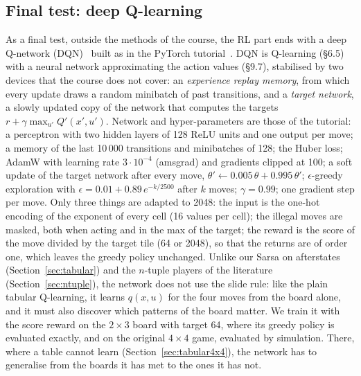 \documentclass[11pt,a4paper]{article}
\theoremstyle{remark}
\begin{document}
\subsection{Final test: deep Q-learning}
\label{sec:dqn}

As a final test, outside the methods of the course, the RL part ends with a deep Q-network (DQN)~\cite{mnih2015} built as in the PyTorch tutorial~\cite{paszke_dqn}. DQN is Q-learning (\S6.5) with a neural network approximating the action values (\S9.7), stabilised by two devices that the course does not cover: an \emph{experience replay memory}, from which every update draws a random minibatch of past transitions, and a \emph{target network}, a slowly updated copy of the network that computes the targets $r+\gamma\max_{u'}Q'(x',u')$. Network and hyper-parameters are those of the tutorial: a perceptron with two hidden layers of 128 ReLU units and one output per move; a memory of the last 10\,000 transitions and minibatches of 128; the Huber loss; AdamW with learning rate $3\cdot10^{-4}$ (amsgrad) and gradients clipped at 100; a soft update of the target network after every move, $\theta'\leftarrow0.005\,\theta+0.995\,\theta'$; $\epsilon$-greedy exploration with $\epsilon=0.01+0.89\,e^{-k/2500}$ after $k$ moves; $\gamma=0.99$; one gradient step per move. Only three things are adapted to 2048: the input is the one-hot encoding of the exponent of every cell (16 values per cell); the illegal moves are masked, both when acting and in the max of the target; the reward is the score of the move divided by the target tile (64 or 2048), so that the returns are of order one, which leaves the greedy policy unchanged. Unlike our Sarsa on afterstates (Section~\ref{sec:tabular}) and the $n$-tuple players of the literature (Section~\ref{sec:ntuple}), the network does not use the slide rule: like the plain tabular Q-learning, it learns $q(x,u)$ for the four moves from the board alone, and it must also discover which patterns of the board matter. We train it with the score reward on the $2\times3$ board with target 64, where its greedy policy is evaluated exactly, and on the original $4\times4$ game, evaluated by simulation. There, where a table cannot learn (Section~\ref{sec:tabular4x4}), the network has to generalise from the boards it has met to the ones it has not.
\end{document}
